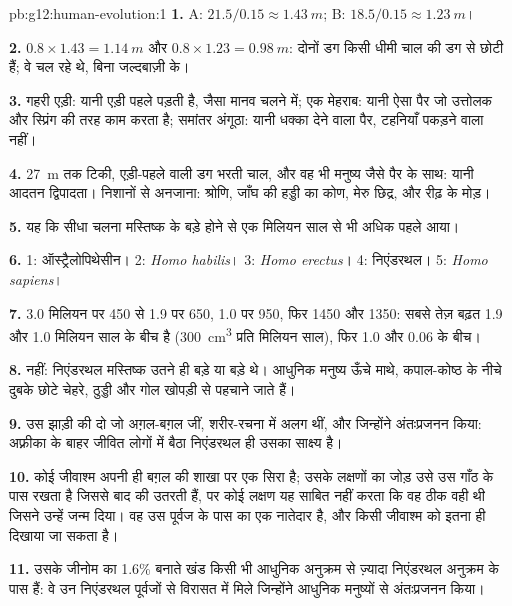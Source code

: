 \begin{solution}{pb:g12:human-evolution:1}
\textbf{1.} A: $21.5/0.15 \approx \qty{1.43}{m}$; B: $18.5/0.15
\approx \qty{1.23}{m}$।

\textbf{2.} $0.8 \times 1.43 = \qty{1.14}{m}$ और $0.8 \times 1.23 =
\qty{0.98}{m}$: दोनों डग किसी धीमी चाल की डग से छोटी हैं; वे चल रहे थे,
बिना जल्दबाज़ी के।

\textbf{3.} गहरी एड़ी: यानी एड़ी पहले पड़ती है, जैसा मानव चलने में; एक
मेहराब: यानी ऐसा पैर जो उत्तोलक और स्प्रिंग की तरह काम करता है; समांतर
अंगूठा: यानी धक्का देने वाला पैर, टहनियाँ पकड़ने वाला नहीं।

\textbf{4.} \qty{27}{m} तक टिकी, एड़ी-पहले वाली डग भरती चाल, और वह भी मनुष्य
जैसे पैर के साथ: यानी आदतन द्विपादता। निशानों से अनजाना: श्रोणि, जाँघ की
हड्डी का कोण, मेरु छिद्र, और रीढ़ के मोड़।

\textbf{5.} यह कि सीधा चलना मस्तिष्क के बड़े होने से एक मिलियन साल से भी
अधिक पहले आया।

\textbf{6.} 1: ऑस्ट्रैलोपिथेसीन। 2: \emph{Homo habilis}। 3: \emph{Homo
erectus}। 4: निएंडरथल। 5: \emph{Homo sapiens}।

\textbf{7.} 3.0 मिलियन पर 450 से 1.9 पर 650, 1.0 पर 950, फिर 1450 और
1350: सबसे तेज़ बढ़त 1.9 और 1.0 मिलियन साल के बीच है (\qty{300}{cm^3} प्रति
मिलियन साल), फिर 1.0 और 0.06 के बीच।

\textbf{8.} नहीं: निएंडरथल मस्तिष्क उतने ही बड़े या बड़े थे। आधुनिक मनुष्य
ऊँचे माथे, कपाल-कोष्ठ के नीचे दुबके छोटे चेहरे, ठुड्डी और गोल खोपड़ी से
पहचाने जाते हैं।

\textbf{9.} उस झाड़ी की दो  जो अग़ल-बग़ल जीं, शरीर-रचना में अलग
थीं, और जिन्होंने अंतःप्रजनन किया: अफ़्रीका के बाहर जीवित लोगों में बैठा
निएंडरथल  ही उसका साक्ष्य है।

\textbf{10.} कोई जीवाश्म अपनी ही बग़ल की शाखा पर एक सिरा है; उसके लक्षणों
का जोड़ उसे उस गाँठ के पास रखता है जिससे बाद की  उतरती हैं, पर कोई
लक्षण यह साबित नहीं करता कि वह ठीक वही  थी जिसने उन्हें जन्म दिया। वह
उस पूर्वज के पास का एक नातेदार है, और किसी जीवाश्म को इतना ही दिखाया जा
सकता है।

\textbf{11.} उसके जीनोम का 1.6\% बनाते खंड किसी भी आधुनिक अनुक्रम से
ज़्यादा निएंडरथल अनुक्रम के पास हैं: वे उन निएंडरथल पूर्वजों से विरासत में
मिले जिन्होंने आधुनिक मनुष्यों से अंतःप्रजनन किया।


\end{solution}
